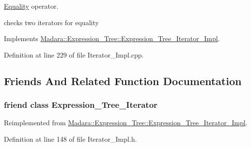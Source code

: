 \hyperlink{classMadara_1_1Expression__Tree_1_1Equality}{Equality} operator. 

checks two iterators for equality 

Implements \hyperlink{classMadara_1_1Expression__Tree_1_1Expression__Tree__Iterator__Impl_a05aaa44a9c047b7863789792d8d7830a}{Madara::Expression\_\-Tree::Expression\_\-Tree\_\-Iterator\_\-Impl}.



Definition at line 229 of file Iterator\_\-Impl.cpp.



\subsection{Friends And Related Function Documentation}
\hypertarget{classMadara_1_1Expression__Tree_1_1Pre__Order__Iterator__Impl_adfe8d209b4dd64ac100d4c9c9adf08c1}{
\subsubsection[{Expression\_\-Tree\_\-Iterator}]{\setlength{\rightskip}{0pt plus 5cm}friend class {\bf Expression\_\-Tree\_\-Iterator}}}
\label{d0/dfb/classMadara_1_1Expression__Tree_1_1Pre__Order__Iterator__Impl_adfe8d209b4dd64ac100d4c9c9adf08c1}


Reimplemented from \hyperlink{classMadara_1_1Expression__Tree_1_1Expression__Tree__Iterator__Impl_adfe8d209b4dd64ac100d4c9c9adf08c1}{Madara::Expression\_\-Tree::Expression\_\-Tree\_\-Iterator\_\-Impl}.



Definition at line 148 of file Iterator\_\-Impl.h.

